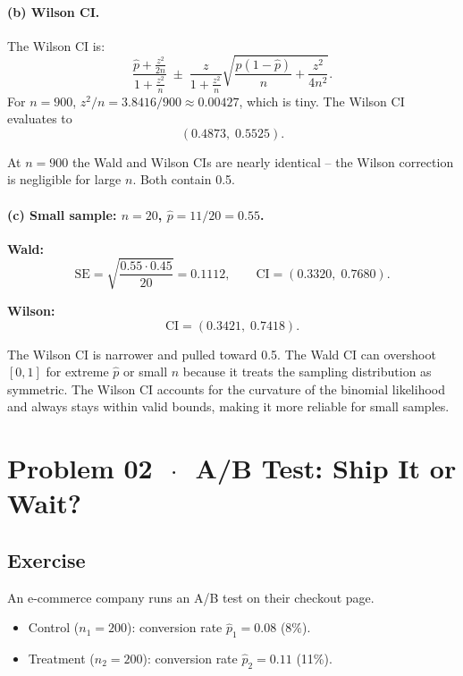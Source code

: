 \documentclass[11pt]{article}
\begin{document}
\paragraph{(b) Wilson CI.}

The Wilson CI is:
\[
  \frac{\hat{p} + \frac{z^2}{2n}}{1 + \frac{z^2}{n}}
  \;\pm\;
  \frac{z}{1 + \frac{z^2}{n}}
  \sqrt{\frac{\hat{p}(1-\hat{p})}{n} + \frac{z^2}{4n^2}}.
\]
For $n = 900$, $z^2/n = 3.8416/900 \approx 0.00427$, which is tiny. The Wilson CI evaluates to
\[
  (0.4873,\; 0.5525).
\]

At $n = 900$ the Wald and Wilson CIs are nearly identical -- the Wilson correction is negligible for large $n$. Both contain 0.5.

\paragraph{(c) Small sample: $n = 20$, $\hat{p} = 11/20 = 0.55$.}

\textbf{Wald:}
\[
  \text{SE} = \sqrt{\frac{0.55 \cdot 0.45}{20}} = 0.1112,
  \qquad
  \text{CI} = (0.3320,\; 0.7680).
\]

\textbf{Wilson:}
\[
  \text{CI} = (0.3421,\; 0.7418).
\]

The Wilson CI is narrower and pulled toward 0.5. The Wald CI can overshoot $[0, 1]$ for extreme $\hat{p}$ or small $n$ because it treats the sampling distribution as symmetric. The Wilson CI accounts for the curvature of the binomial likelihood and always stays within valid bounds, making it more reliable for small samples.

\section*{Problem 02 \texorpdfstring{$\,\cdot\,$}{-} A/B Test: Ship It or Wait?}

\subsection*{Exercise}

An e-commerce company runs an A/B test on their checkout page.

\begin{itemize}
  \item Control ($n_1 = 200$): conversion rate $\hat{p}_1 = 0.08$ (8\%).
  \item Treatment ($n_2 = 200$): conversion rate $\hat{p}_2 = 0.11$ (11\%).
\end{itemize}
\end{document}
